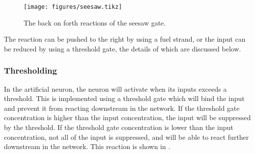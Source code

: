 \begin{figure}[h]
\texttt{[image: figures/seesaw.tikz]}
\caption{The back on forth reactions of the seesaw gate.}
\label{seesaw}
\end{figure}

The reaction can be pushed to the right by using a fuel strand, or the input can be reduced by using a threshold gate, the details of which are discussed below.

\subsubsection{Thresholding}
In the artificial neuron, the neuron will activate when its inputs exceeds a threshold. This is implemented using a threshold gate which will bind the input and prevent it from reacting downstream in the network. If the threshold gate concentration is higher than the input concentration, the input will be suppressed by the threshold. If the threshold gate concentration is lower than the input concentration, not all of the input is suppressed, and will be able to react further downstream in the network. This reaction is shown in .


